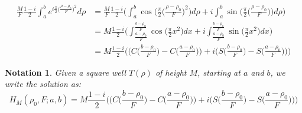 \documentclass{article}
\theoremstyle{mystyle}
\newtheorem{notation}{Notation}[section]
\begin{document}
\begin{align*}
\nonumber \frac{M}{F}\frac{1-i}{2}\int_{a}^{b}e^{i\frac{\pi}{2}\big(\frac{\rho-\rho_0}{F}\big)^2}d\rho &= \frac{M}{F}\frac{1-i}{2}\Bigg(\int_{a}^{b} \cos\bigg(\frac{\pi}{2}\big(\frac{\rho-\rho_0}{F}\big)^2\bigg)d\rho + i\int_{a}^{b} \sin\bigg(\frac{\pi}{2}\big(\frac{\rho-\rho_0}{F}\big)\bigg)d\rho\Bigg) \\
 &= M\frac{1-i}{2}\Bigg(\int_{\frac{a-\rho_0}{F}}^{\frac{b-\rho_0}{F}}\cos\bigg(\frac{\pi}{2}x^2\bigg)dx + i\int_{\frac{a-\rho_0}{F}}^{\frac{b-\rho_0}{F}}\sin\bigg(\frac{\pi}{2}x^2\bigg)dx\Bigg)\\
\nonumber &= M\frac{1-i}{2}\Bigg(\bigg(C\big(\frac{b-\rho_0}{F}\big)-C\big(\frac{a-\rho_0}{F}\big)\bigg)+i\bigg(S\big(\frac{b-\rho_0}{F}\big)-S\big(\frac{a-\rho_0}{F}\big)\bigg)\Bigg)
\end{align*}
\begin{notation}
Given a square well $T(\rho)$ of height $M$, starting at $a$ and $b$, we write the solution as:
\begin{equation*}
H_{M}(\rho_0,F;a,b) = M\frac{1-i}{2}\Bigg(\bigg(C\big(\frac{b-\rho_0}{F}\big)-C\big(\frac{a-\rho_0}{F}\big)\bigg)+i\bigg(S\big(\frac{b-\rho_0}{F}\big)-S\big(\frac{a-\rho_0}{F}\big)\bigg)\Bigg)
\end{equation*}
\end{notation}
\end{document}
